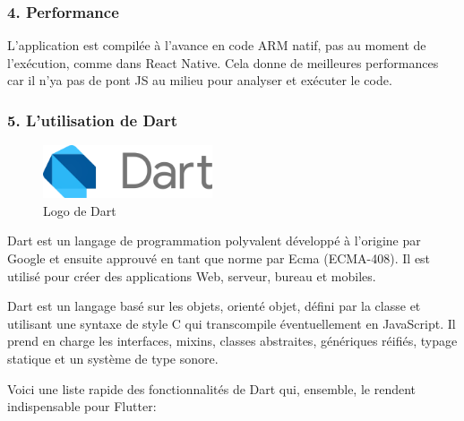 \subsubsection{4. Performance}
L'application est compilée à l'avance en code ARM natif, pas au moment de l'exécution, comme dans React Native. Cela donne de meilleures performances car il n’ya pas de pont JS au milieu pour analyser et exécuter le code.

\subsubsection{5. L'utilisation de Dart}

\begin{figure}
	\includegraphics[width=5cm]{Images/chapter2/dart_logo.png}
	\vspace{-20pt}
	\caption{{\footnotesize Logo de Dart}}
\end{figure}

Dart est un langage de programmation polyvalent développé à l'origine par Google et ensuite approuvé en tant que norme par Ecma (ECMA-408). Il est utilisé pour créer des applications Web, serveur, bureau et mobiles.

Dart est un langage basé sur les objets, orienté objet, défini par la classe et utilisant une syntaxe de style C qui transcompile éventuellement en JavaScript. Il prend en charge les interfaces, mixins, classes abstraites, génériques réifiés, typage statique et un système de type sonore.\cite{noauthor_dart_2019}\medskip

Voici une liste rapide des fonctionnalités de Dart qui, ensemble, le rendent indispensable pour Flutter:


